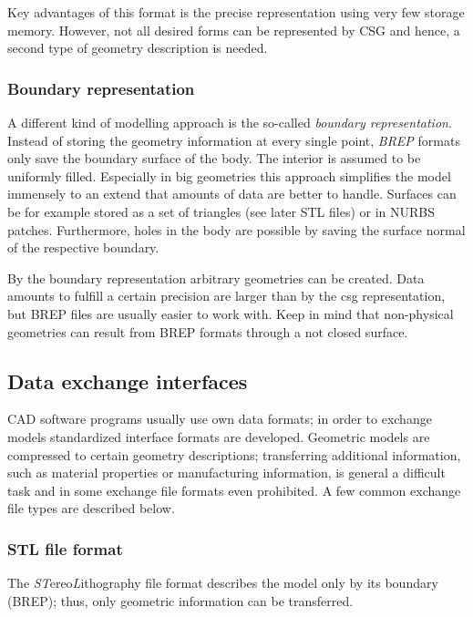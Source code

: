 Key advantages of this format is the precise representation using very few storage memory. However, not all desired forms can be represented by CSG and hence, a second type of geometry description is needed. 
\subsubsection{Boundary representation}
A different kind of modelling approach is the so-called \emph{boundary representation}. Instead of storing the geometry information at every single point, \emph{BREP} formats only save the boundary surface of the body. The interior is assumed to be uniformly filled. Especially in big geometries this approach simplifies the model immensely to an extend that amounts of data are better to handle. Surfaces can be for example stored as a set of triangles (see later STL files) or in NURBS patches.
Furthermore, holes in the body are possible by saving the surface normal of the respective boundary. 

By the boundary representation arbitrary geometries can be created. Data amounts to fulfill a certain precision are larger than by the csg representation, but BREP files are usually easier to work with. Keep in mind that non-physical geometries can result from BREP formats through a not closed surface.
\subsection{Data exchange interfaces}
CAD software programs usually use own data formats; in order to exchange models standardized interface formats are developed. Geometric models are compressed to certain geometry descriptions; transferring additional information, such as material properties or manufacturing information, is general a difficult task and in some exchange file formats even prohibited. A few common exchange file types are described below.
\subsubsection{STL file format}
The \emph{ST}ereo\emph{L}ithography file format describes the model only by its boundary (BREP); thus, only geometric information can be transferred. 

